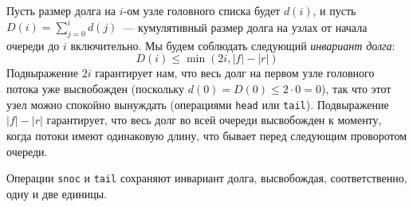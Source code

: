 Пусть размер долга на $i$-ом узле головного списка будет $d(i)$, и
пусть $D(i) = \sum_{j=0}^i d(j)$~--- кумулятивный размер долга на
узлах от начала очереди до $i$ включительно. Мы будем соблюдать
следующий \emph{инвариант долга}:
$$
D(i) \le \min(2i, |f| - |r|)
$$
Подвыражение $2i$ гарантирует нам, что весь долг на первом узле
головного потока уже высвобожден (поскольку $d(0) = D(0) \le 2 \cdot 0
= 0$), так что этот узел можно спокойно вынуждать (операциями
\lstinline!head! или \lstinline!tail!). Подвыражение $|f| - |r|$
гарантирует, что весь долг во всей очереди высвобожден к моменту,
когда потоки имеют одинаковую длину, что бывает перед следующим
проворотом очереди.

\begin{theorem}\label{th:6.1}
  Операции \lstinline!snoc! и \lstinline!tail! сохраняют инвариант
  долга, высвобождая, соответственно, одну и две единицы.


\end{theorem}
